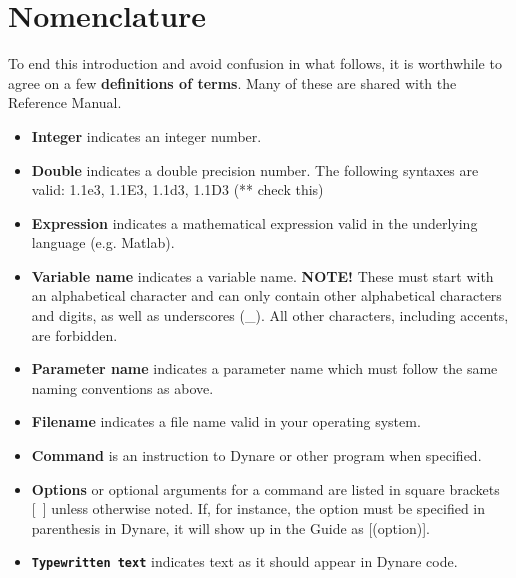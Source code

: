 \section{Nomenclature}
To end this introduction and avoid confusion in what follows, it is worthwhile to agree on a few \textbf{definitions of terms}. Many of these are shared with the Reference Manual. 
\begin{itemize}
\item \textbf{Integer} indicates an integer number.
\item \textbf{Double} indicates a double precision number. The following syntaxes are valid: 1.1e3, 1.1E3, 1.1d3, 1.1D3 (** check this)
\item \textbf{Expression} indicates a mathematical expression valid in the underlying language (e.g. Matlab).
\item \textbf{Variable name} indicates a variable name. \textbf{\textsf{NOTE!}} These must start with an alphabetical character and can only contain other alphabetical characters and digits, as well as underscores (\_). All other characters, including accents, are forbidden. 
\item \textbf{Parameter name} indicates a parameter name which must follow the same naming conventions as above. 
\item \textbf{Filename} indicates a file name valid in your operating system.
\item \textbf{Command} is an instruction to Dynare or other program when specified. 
\item \textbf{Options} or optional arguments for a command are listed in square brackets \mbox{[ ]} unless otherwise noted. If, for instance, the option must be specified in parenthesis in Dynare, it will show up in the Guide as [(option)].
\item \textbf{\texttt{Typewritten text}} indicates text as it should appear in Dynare code.

\end{itemize}


 

